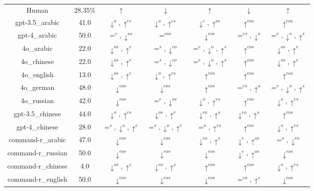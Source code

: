 \documentclass{article}
\begin{document}
\begin{table}[h!]
{\begin{tabular}{ccccccc}
Human        & 28.35\%  & $\uparrow$ & $\downarrow$ & $\uparrow$ & $\downarrow$ & $\uparrow$ \\        
gpt-3.5\_arabic & 41.0 & $\downarrow^{o},\uparrow^{es}$ & $\downarrow^{o},\uparrow^{es}$ & $\downarrow^{e},\uparrow^{os}$ & $\uparrow^{eos}$ & $\uparrow^{eos}$ \\
gpt-4\_arabic & 50.0 & $=^{e},\downarrow^{os}$ & $=^{eos}$ & $\downarrow^{eos}$ & $=^{es},\downarrow^{o}$ & $=^{e},\downarrow^{o},\uparrow^{s}$ \\
4o\_arabic & 22.0 & $\downarrow^{os},\uparrow^{e}$ & $=^{s},\downarrow^{eo}$ & $=^{e},\downarrow^{o},\uparrow^{s}$ & $\uparrow^{eos}$ & $\downarrow^{os},\uparrow^{e}$ \\
4o\_chinese & 22.0 & $\downarrow^{os},\uparrow^{e}$ & $=^{s},\downarrow^{eo}$ & $=^{e},\downarrow^{o},\uparrow^{s}$ & $\uparrow^{eos}$ & $\downarrow^{os},\uparrow^{e}$ \\
4o\_english & 13.0 & $\downarrow^{os},\uparrow^{e}$ & $\downarrow^{o},\uparrow^{es}$ & $\uparrow^{eos}$ & $\uparrow^{eos}$ & $\uparrow^{eos}$ \\
4o\_german & 48.0 & $\downarrow^{eos}$ & $\downarrow^{eos}$ & $\uparrow^{eos}$ & $=^{es},\uparrow^{o}$ & $=^{e},\downarrow^{o},\uparrow^{s}$ \\
4o\_russian & 42.0 & $\downarrow^{eos}$ & $=^{e},\downarrow^{os}$ & $\downarrow^{o},\uparrow^{es}$ & $\uparrow^{eos}$ & $\downarrow^{o},\uparrow^{es}$ \\
gpt-3.5\_chinese & 44.0 & $\downarrow^{o},\uparrow^{es}$ & $\downarrow^{os},\uparrow^{e}$ & $\downarrow^{eo},\uparrow^{s}$ & $\downarrow^{eo},\uparrow^{s}$ & $\uparrow^{eos}$ \\
gpt-4\_chinese & 28.0 & $=^{s},\downarrow^{o},\uparrow^{e}$ & $=^{s},\downarrow^{o},\uparrow^{e}$ & $=^{o},\uparrow^{es}$ & $\uparrow^{eos}$ & $\downarrow^{o},\uparrow^{es}$ \\
command-r\_arabic & 47.0 & $\downarrow^{eos}$ & $\downarrow^{eos}$ & $\downarrow^{eo},\uparrow^{s}$ & $\downarrow^{e},\uparrow^{os}$ & $=^{s},\downarrow^{eo}$ \\
command-r\_russian & 50.0 & $\downarrow^{eos}$ & $\downarrow^{eos}$ & $\downarrow^{eos}$ & $\downarrow^{e},\uparrow^{os}$ & $\downarrow^{eos}$ \\
command-r\_chinese & 4.0 & $\downarrow^{os},\uparrow^{e}$ & $\downarrow^{eo},\uparrow^{s}$ & $\uparrow^{eos}$ & $\uparrow^{eos}$ & $\downarrow^{o},\uparrow^{es}$ \\
command-r\_english & 50.0 & $\downarrow^{eos}$ & $\downarrow^{eos}$ & $\downarrow^{eos}$ & $=^{eo},\uparrow^{s}$ & $\downarrow^{eos}$ \\

\end{tabular}}
\end{table}
\end{document}
